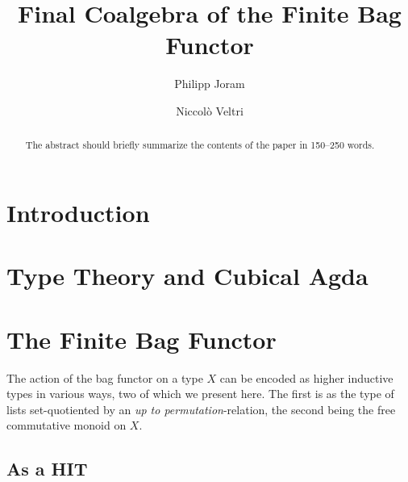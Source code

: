 \documentclass[runningheads]{llncs}
\begin{document}
\title{Final Coalgebra of the Finite Bag Functor}
\author{%
    Philipp Joram \and
    Niccolò Veltri%
}
%

\maketitle              %

\begin{abstract}
The abstract should briefly summarize the contents of the paper in
150--250 words.

\end{abstract}

\section{Introduction}

\section{Type Theory and Cubical Agda}

\section{The Finite Bag Functor}

The action of the bag functor on a type $X$ can be encoded as higher inductive
types in various ways, two of which we present here.
The first is as the type of lists set-quotiented by an \emph{up to permutation}-relation,
the second being the free commutative monoid on $X$.


\subsection{As a HIT}
\end{document}
